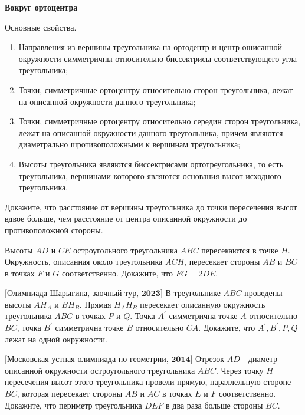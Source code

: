 \centerline{\bf \Huge Вокруг ортоцентра}

Основные свойства.
\begin{enumerate}
    \item Направления из вершины треугольника на ортодентр и центр ошисанной окружности симметричны относительно биссектрисы соответствующего угла треугольника;

    \item Точки, симметричные ортоцентру относительно сторон треугольника, лежат на описанной окружности данного треугольника;

    \item Точки, симметричные ортоцентру относительно середин сторон треугольника, лежат на описанной окружности данного треугольника, причем являются диаметрально шротивоположными к вершинам треугольника;

    \item Высоты треугольника являются биссектрисами ортотреугольника, то есть треугольника, вершинами которого являются основания высот исходного треугольника.
\end{enumerate}



 Докажите, что расстояние от вершины треугольника до точки пересечения высот вдвое больше, чем расстояние от центра описанной окружности до противоположной стороны.

 Высоты $A D$ и $C E$ остроугольного треугольника $A B C$ пересекаются в точке $H$. Окружность, описанная около треугольника $A C H$, пересекает стороны $A B$ и $B C$ в точках $F$ и $G$ соответственно. Докажите, что $F G=2 D E$.

$\bigl[\textbf{Олимпиада Шарыгина, заочный тур, 2023}\bigr]$
В треугольнике $A B C$ проведены высоты $A H_A$ и $B H_B$. Прямая $H_A H_B$ пересекает описанную окружность треугольника $A B C$ в точках $P$ и $Q$. Точка $A^{\prime}$ симметрична точке $A$ относительно $B C$, точка $B^{\prime}$ симметрична точке $B$ относительно $C A$. Докажите, что $A^{\prime}, B^{\prime}, P, Q$ лежат на одной окружности.

$\bigl[\textbf{Московская устная олимпиада по геометрии, 2014}\bigr]$
Отрезок $A D$ - диаметр описанной окружности остроугольного треугольника $A B C$. Через точку $H$ пересечения высот этого треугольника провели прямую, параллельную стороне $B C$, которая пересекает стороны $A B$ и $A C$ в точках $E$ и $F$ соответственно. Докажите, что периметр треугольника $D E F$ в два раза больше стороны $B C$.

